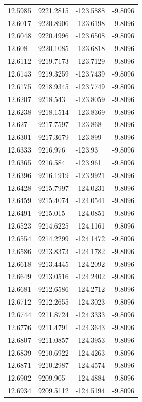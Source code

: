 \begin{table}[H]
\begin{tabular}{llll}
12.5985 & 9221.2815 & -123.5888 & -9.8096 \\
12.6017 & 9220.8906 & -123.6198 & -9.8096 \\
12.6048 & 9220.4996 & -123.6508 & -9.8096 \\
12.608 & 9220.1085 & -123.6818 & -9.8096 \\
12.6112 & 9219.7173 & -123.7129 & -9.8096 \\
12.6143 & 9219.3259 & -123.7439 & -9.8096 \\
12.6175 & 9218.9345 & -123.7749 & -9.8096 \\
12.6207 & 9218.543 & -123.8059 & -9.8096 \\
12.6238 & 9218.1514 & -123.8369 & -9.8096 \\
12.627 & 9217.7597 & -123.868 & -9.8096 \\
12.6301 & 9217.3679 & -123.899 & -9.8096 \\
12.6333 & 9216.976 & -123.93 & -9.8096 \\
12.6365 & 9216.584 & -123.961 & -9.8096 \\
12.6396 & 9216.1919 & -123.9921 & -9.8096 \\
12.6428 & 9215.7997 & -124.0231 & -9.8096 \\
12.6459 & 9215.4074 & -124.0541 & -9.8096 \\
12.6491 & 9215.015 & -124.0851 & -9.8096 \\
12.6523 & 9214.6225 & -124.1161 & -9.8096 \\
12.6554 & 9214.2299 & -124.1472 & -9.8096 \\
12.6586 & 9213.8373 & -124.1782 & -9.8096 \\
12.6618 & 9213.4445 & -124.2092 & -9.8096 \\
12.6649 & 9213.0516 & -124.2402 & -9.8096 \\
12.6681 & 9212.6586 & -124.2712 & -9.8096 \\
12.6712 & 9212.2655 & -124.3023 & -9.8096 \\
12.6744 & 9211.8724 & -124.3333 & -9.8096 \\
12.6776 & 9211.4791 & -124.3643 & -9.8096 \\
12.6807 & 9211.0857 & -124.3953 & -9.8096 \\
12.6839 & 9210.6922 & -124.4263 & -9.8096 \\
12.6871 & 9210.2987 & -124.4574 & -9.8096 \\
12.6902 & 9209.905 & -124.4884 & -9.8096 \\
12.6934 & 9209.5112 & -124.5194 & -9.8096 \\

\end{tabular}
\end{table}
